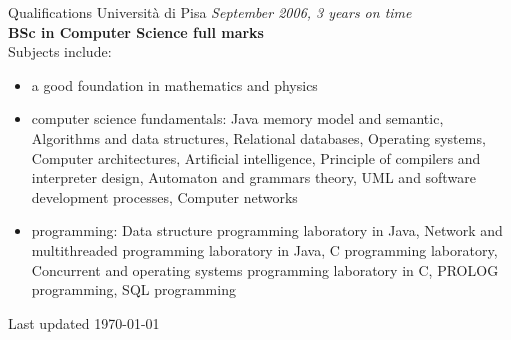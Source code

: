 \documentclass{resume}
\begin{document}
\begin{rSection}{Qualifications}
    Universit\`a di Pisa \hfill {\em September 2006, 3 years on time} \\
    {\bf BSc in Computer Science full marks}\\
    Subjects include:
    \begin{itemize}
    \item a good foundation in mathematics and physics
    \item computer science fundamentals: 
      Java memory model and semantic, Algorithms and data structures, Relational databases,
	  Operating systems, Computer architectures, Artificial intelligence, Principle of compilers and interpreter design,
	  Automaton and grammars theory, UML and software development processes, Computer networks
    \item programming: 
      Data structure programming laboratory in Java, Network and multithreaded programming laboratory in Java,
	  C programming laboratory, Concurrent and operating systems programming laboratory in C,
	  PROLOG programming, SQL programming
    \end{itemize}

  \end{rSection}


  \begin{rSection}{}
    Last updated \today 
  \end{rSection}
\end{document}
